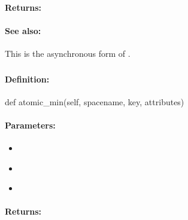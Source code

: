 \paragraph{Returns:}


\paragraph{See also:}  This is the asynchronous form of .

\pagebreak
\subsubsection{}
\label{api:python:atomic_min}


\paragraph{Definition:}
\begin{pythoncode}
def atomic_min(self, spacename, key, attributes)
\end{pythoncode}

\paragraph{Parameters:}
\begin{itemize}[noitemsep]
\item {}\\

\item {}\\

\item {}\\

\end{itemize}

\paragraph{Returns:}


\pagebreak
\subsubsection{}
\label{api:python:async_atomic_min}


